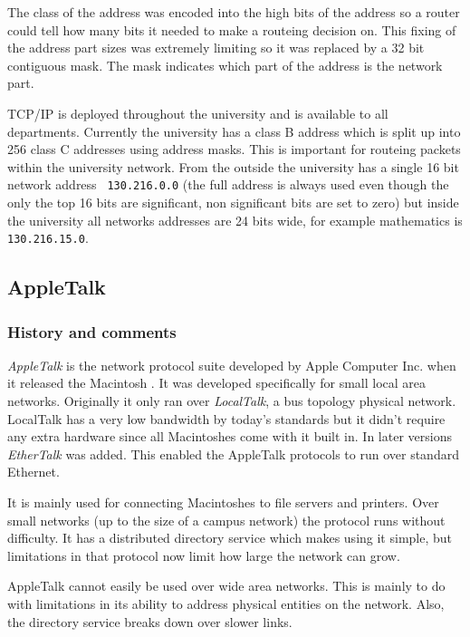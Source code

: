 The class of the address was encoded into the high bits of the address
so a router could tell how many bits it needed to make a routeing
decision on.  This fixing of the address part sizes was extremely
limiting so it was replaced by a 32 bit contiguous mask.  The mask
indicates which part of the address is the network part.

TCP/IP is deployed throughout the university and is available to all
departments.  Currently the university has a class B address which is
split up into 256 class C addresses using address masks.  This is
important for routeing packets within the university network.  From the
outside the university has a single 16 bit network address {\tt
130.216.0.0} (the full address is always used even though the only the
top 16 bits are significant, non significant bits are set to zero) but
inside the university all networks addresses are 24 bits wide, for
example mathematics is {\tt 130.216.15.0}.

\subsection{AppleTalk}
\label{network:appletalk}

\subsubsection{History and comments}

{\em AppleTalk} is the network protocol suite developed by Apple
Computer Inc. when it released the Macintosh \cite{AppleTalk:Apple}.
It was developed specifically for small local area networks.
Originally it only ran over {\em LocalTalk}, a bus topology physical
network.  LocalTalk has a very low bandwidth by today's standards but
it didn't require any extra hardware since all Macintoshes come with
it built in.  In later versions {\em EtherTalk} was added.  This
enabled the AppleTalk protocols to run over standard Ethernet.

It is mainly used for connecting Macintoshes to file servers and
printers.  Over small networks (up to the size of a campus network)
the protocol runs without difficulty.  It has a distributed directory
service which makes using it simple, but limitations in that protocol
now limit how large the network can grow.

AppleTalk cannot easily be used over wide area networks.  This is
mainly to do with limitations in its ability to address physical
entities on the network.  Also, the directory service breaks down over
slower links.

